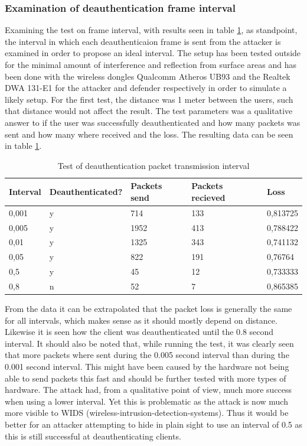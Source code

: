 \subsubsection{Examination of deauthentication frame interval}
Examining the test on frame interval, with results seen in table \ref{Examination of deauthentication frame interval}, as standpoint, the interval in which each deauthenticaion frame is sent from the attacker is examined in order to propose an ideal interval. The setup has been tested outside for the minimal amount of interference and reflection from surface areas and has been done with the wireless dongles Qualcomm Atheros UB93 and the Realtek DWA 131-E1 for the attacker and defender respectively in order to simulate a likely setup. For the first test, the distance was 1 meter between the users, such that distance would not affect the result. The test parameters was a qualitative answer to if the user was successfully deauthenticated and how many packets was sent and how many where received and the loss. The resulting data can be seen in table \ref{Examination of deauthentication frame interval}.

\begin{table}[!htbp]
\centering
\begin{tabular}{lllll}
\hline
Interval & Deauthenticated? & Packets send & Packets recieved & Loss     \\ \hline
0,001    & y                & 714          & 133              & 0,813725 \\
0,005    & y                & 1952         & 413              & 0,788422 \\
0,01     & y                & 1325         & 343              & 0,741132 \\
0,05     & y                & 822          & 191              & 0,76764  \\
0,5      & y                & 45           & 12               & 0,733333 \\
0,8      & n                & 52           & 7                & 0,865385 \\ \hline
\end{tabular}
\caption{Test of deauthentication packet transmission interval}
\label{Examination of deauthentication frame interval}
\end{table}

From the data it can be extrapolated that the packet loss is generally the same for all intervals, which makes sense as it should mostly depend on distance. Likewise it is seen how the client was deauthenticated until the 0.8 second interval. It should also be noted that, while running the test, it was clearly seen that more packets where sent during the 0.005 second interval than during the 0.001 second interval. This might have been caused by the hardware not being able to send packets this fast and should be further tested with more types of hardware. The attack had, from a qualitative point of view, much more success when using a lower interval. Yet this is problematic as the attack is now much more visible to WIDS (wireless-intrusion-detection-systems). Thus it would be better for an attacker attempting to hide in plain sight to use an interval of 0.5 as this is still successful at deauthenticating clients.

